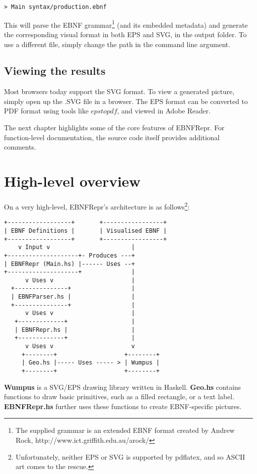 \documentclass[a4paper]{article}
\begin{document}
\begin{verbatim}
> Main syntax/production.ebnf
\end{verbatim}

This will parse the EBNF grammar\footnote{The supplied grammar is an extended EBNF format created by Andrew Rock, http://www.ict.griffith.edu.au/arock/} (and its embedded metadata) and generate the corresponding visual format in both EPS and SVG, in the output folder. To use a different file, simply change the path in the command line argument.

\subsection{Viewing the results}
Most browsers today support the SVG format. To view a generated picture, simply open up the .SVG file in a browser. The EPS
format can be converted to PDF format using tools like $epstopdf$, and viewed in Adobe Reader.

The next chapter highlights some of the core features of EBNFRepr. For function-level documentation, the source code itself provides additional comments.

\section{High-level overview}
On a very high-level, EBNFRepr's architecture is as follows\footnote{Unfortunately, neither EPS or SVG is supported by pdflatex, and so ASCII art comes to the rescue.}:

\begin{verbatim}
+------------------+       +-----------------+
| EBNF Definitions |       | Visualised EBNF | 
+------------------+       +-----------------+          
    v Input v                       |
+--------------------+- Produces ---+
| EBNFRepr (Main.hs) |------ Uses --+
+--------------------+              |
      v Uses v                      |
  +---------------+                 |
  | EBNFParser.hs |                 |
  +---------------+                 |
      v Uses v                      |
   +-------------+                  |
   | EBNFRepr.hs |                  |
   +-------------+                  |
      v Uses v                      v
     +--------+                   +--------+
     | Geo.hs |----- Uses ----- > | Wumpus |
     +--------+                   +--------+
\end{verbatim}

\textbf{Wumpus} is a SVG/EPS drawing library written in Haskell. \textbf{Geo.hs} contains functions to draw basic primitives, such as a filled rectangle, or a text label. \textbf{EBNFRepr.hs} further uses these functions to create EBNF-specific pictures.
\end{document}

